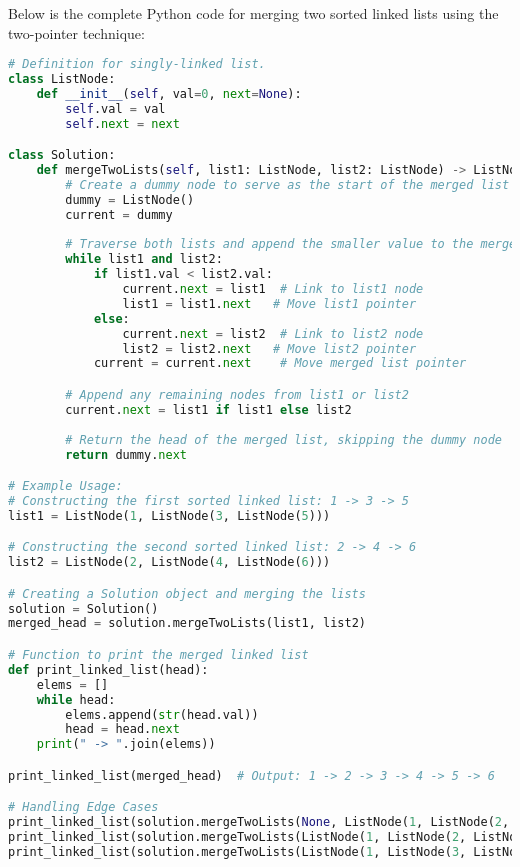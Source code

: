 Below is the complete Python code for merging two sorted linked lists using the two-pointer technique:

\begin{fullwidth}
\begin{lstlisting}[language=Python]
# Definition for singly-linked list.
class ListNode:
    def __init__(self, val=0, next=None):
        self.val = val
        self.next = next

class Solution:
    def mergeTwoLists(self, list1: ListNode, list2: ListNode) -> ListNode:
        # Create a dummy node to serve as the start of the merged list
        dummy = ListNode()
        current = dummy
        
        # Traverse both lists and append the smaller value to the merged list
        while list1 and list2:
            if list1.val < list2.val:
                current.next = list1  # Link to list1 node
                list1 = list1.next   # Move list1 pointer
            else:
                current.next = list2  # Link to list2 node
                list2 = list2.next   # Move list2 pointer
            current = current.next    # Move merged list pointer

        # Append any remaining nodes from list1 or list2
        current.next = list1 if list1 else list2
        
        # Return the head of the merged list, skipping the dummy node
        return dummy.next

# Example Usage:
# Constructing the first sorted linked list: 1 -> 3 -> 5
list1 = ListNode(1, ListNode(3, ListNode(5)))

# Constructing the second sorted linked list: 2 -> 4 -> 6
list2 = ListNode(2, ListNode(4, ListNode(6)))

# Creating a Solution object and merging the lists
solution = Solution()
merged_head = solution.mergeTwoLists(list1, list2)

# Function to print the merged linked list
def print_linked_list(head):
    elems = []
    while head:
        elems.append(str(head.val))
        head = head.next
    print(" -> ".join(elems))

print_linked_list(merged_head)  # Output: 1 -> 2 -> 3 -> 4 -> 5 -> 6

# Handling Edge Cases
print_linked_list(solution.mergeTwoLists(None, ListNode(1, ListNode(2, ListNode(3)))))  # Output: 1 -> 2 -> 3
print_linked_list(solution.mergeTwoLists(ListNode(1, ListNode(2, ListNode(3))), None))  # Output: 1 -> 2 -> 3
print_linked_list(solution.mergeTwoLists(ListNode(1, ListNode(3, ListNode(5))), ListNode(1, ListNode(3, ListNode(5)))))  # Output: 1 -> 1 -> 3 -> 3 -> 5 -> 5
\end{lstlisting}
\end{fullwidth}

